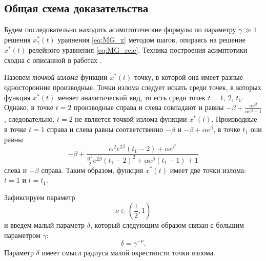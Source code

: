 \subsection{Общая схема доказательства}
Будем последовательно находить асимптотические формулы по параметру $\gamma \gg 1$ решения $x_{\gamma}^*(t)$ уравнения \eqref{eq:MG_x} методом шагов, опираясь на решение $x^*(t)$ релейного уравнения \eqref{eq:MG_rele}. Техника построения асимптотики сходна с описанной в работах \cite{Kolesov2010, Glyzin2013}.

Назовем \textit{точкой излома} функции $x^*(t)$ точку, в которой она имеет разные односторонние производные. Точки излома следует искать среди точек, в которых функция $x^*(t)$ меняет аналитический вид, то есть среди точек $t = 1$, $2$, $t_1$. Однако, в точке $t = 2$ производные справа и слева совпадают и равны $-\beta+\frac{\alpha e^{\beta}}{\alpha e^{\beta}+1}$, следовательно, $t = 2$ не является точкой излома функции $x^*(t)$. Производные в точке $t = 1$ справа и слева равны соответственно $-\beta$ и $-\beta + \alpha e^\beta$, в точке $t_1$ они равны
%
$$-\beta + \frac{\alpha^2 e^{2\beta}(t_1 - 2) + \alpha e^\beta}{\frac{\alpha^2}{2} e^{2\beta}(t_1-2)^2+\alpha e^{\beta}(t_1 - 1) + 1}$$
%
слева и $-\beta$ справа. 
Таким образом, функция $x^*(t)$ имеет две точки излома: $t = 1$ и $t = t_1$.

Зафиксируем параметр
%
\begin{equation}
	\label{eq:nu_small}
	\nu \in \left( \frac{1}{2}, 1 \right)
\end{equation}
%
и введем малый параметр $\delta$, который следующим образом связан с большим параметром $\gamma$:  
%
\[\delta=\gamma^{-\nu}.\]
%
Параметр $\delta$ имеет смысл радиуса малой окрестности точки излома.

